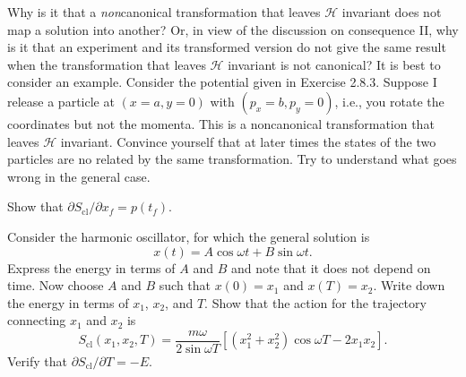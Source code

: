 \documentclass[../principles-of-quantum-mechanics.tex]{subfiles}
\begin{document}
\begin{questions}
		\question Why is it that a \textit{non}canonical transformation that leaves $\mathcal{H}$ invariant does not map a solution into another? Or, in view of the discussion on consequence II, why is it that an experiment and its transformed version do not give the same result when the transformation that leaves $\mathcal{H}$ invariant is not canonical? It is best to consider an example. Consider the potential given in Exercise 2.8.3. Suppose I release a particle at $(x = a, y = 0)$ with $(p_x = b, p_y = 0)$, i.e., you rotate the coordinates but not the momenta. This is a noncanonical transformation that leaves $\mathcal{H}$ invariant. Convince yourself that at later times the states of the two particles are no related by the same transformation. Try to understand what goes wrong in the general case.
		
		\question Show that $\partial S_{\text{cl}}/\partial x_f = p(t_f)$.
		
		\question Consider the harmonic oscillator, for which the general solution is
		\[
			x(t) = A\cos\omega t + B\sin\omega t.
		\]
		Express the energy in terms of $A$ and $B$ and note that it does not depend on time. Now choose $A$ and $B$ such that $x(0) = x_1$ and $x(T) = x_2$. Write down the energy in terms of $x_1$, $x_2$, and $T$. Show that the action for the trajectory connecting $x_1$ and $x_2$ is
		\[
			S_{\text{cl}}(x_1, x_2, T) = \frac{m\omega}{2\sin\omega T}[(x_1^2+x_2^2)\cos\omega T - 2x_1x_2].
		\]
		Verify that $\partial S_{\text{cl}}/\partial T = -E$.
	\end{questions}
\end{document}
